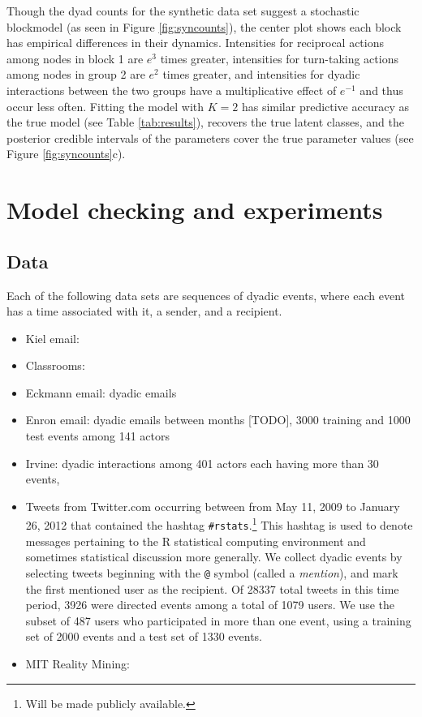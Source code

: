 \documentclass{article}
\begin{document}
Though the dyad counts for the synthetic data set suggest a stochastic blockmodel (as seen in Figure  \ref{fig:syncounts}),  the center plot shows each block has empirical differences in their dynamics.  Intensities for reciprocal actions among nodes in block 1 are $e^3$ times greater, intensities for turn-taking actions among nodes in group 2 are $e^2$ times greater, and intensities for dyadic interactions between the two groups have a multiplicative effect of $e^{-1}$ and thus occur less often.  Fitting the model with $K=2$ has similar  predictive accuracy as the true model (see Table \ref{tab:results}), recovers the true latent classes, and the posterior credible intervals of the parameters cover the true parameter values (see Figure \ref{fig:syncounts}c).

\section{Model checking and experiments}

\subsection{Data}

Each of the following data sets are sequences of dyadic events, where each event has a time associated with it, a sender, and a recipient.

\begin{itemize}
\item Kiel email: \cite{Ebel2002}
\item Classrooms: \cite{McFarland2003}
\item Eckmann email: dyadic emails  \cite{Eckmann}
\item Enron email: dyadic emails between months [TODO], 3000 training and 1000 test events among 141 actors \cite{Enron}
\item Irvine: dyadic interactions among 401 actors each having more than 30 events,  \cite{Opsahl}
\item Tweets from Twitter.com occurring between from May 11, 2009 to January 26, 2012 that contained the hashtag \texttt{\#rstats}.\footnote{Will be made publicly available.}  This hashtag is used to denote messages pertaining to the R statistical computing environment and sometimes statistical discussion more generally.  We collect dyadic events by selecting tweets beginning with the \texttt{@} symbol (called a \emph{mention}), and mark the first mentioned user as the recipient.  Of 28337 total tweets in this time period, 3926 were directed events among a total of 1079 users.  We use the subset of 487 users who participated in more than one event, using a training set of 2000 events and a test set of 1330 events.
\item MIT Reality Mining:  \cite{MITreality}
\end{itemize}
\end{document}
